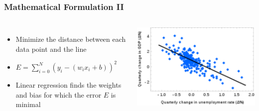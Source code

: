 \begin{frame}
    \frametitle{Mathematical Formulation II}
    \begin{columns}
            \begin{itemize}
                \item Minimize the distance between each data point and the line
                \item $ E = \sum_{i=0}^{N}(y_i - (w_i x_i + b))^2$
                \item Linear regression finds the weights and bias for which the error $E$ is minimal
            \end{itemize}
            \includegraphics[width=1\linewidth]{linreg-pics/lg}\\
    \end{columns}
\end{frame}



